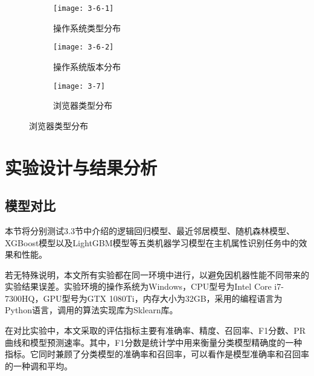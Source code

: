 \begin{figure}[!htbp]
    \centering
    \begin{subfigure}[b]{0.32\textwidth}
      \texttt{[image: 3-6-1]}
      \caption{操作系统类型分布}
    \end{subfigure}%
    \hspace{10pt}
    \begin{subfigure}[b]{0.32\textwidth}
      \texttt{[image: 3-6-2]}
      \caption{操作系统版本分布}
    \end{subfigure}
    \hspace{10pt}
    \begin{subfigure}[b]{0.29\textwidth}
      \texttt{[image: 3-7]}
      \caption{浏览器类型分布}
    \end{subfigure}  
    \centering  
\end{figure}

\section{实验设计与结果分析}

\subsection{模型对比}

本节将分别测试3.3节中介绍的逻辑回归模型、最近邻居模型、随机森林模型、XGBoost模型以及LightGBM模型等五类机器学习模型在主机属性识别任务中的效果和性能。

若无特殊说明，本文所有实验都在同一环境中进行，以避免因机器性能不同带来的实验结果误差。实验环境的操作系统为Windows，CPU型号为Intel Core i7-7300HQ，GPU型号为GTX 1080Ti，内存大小为32GB，采用的编程语言为Python语言，调用的算法实现库为Sklearn库。

在对比实验中，本文采取的评估指标主要有准确率、精度、召回率、F1分数、PR曲线和模型预测速率。其中，F1分数是统计学中用来衡量分类模型精确度的一种指标。它同时兼顾了分类模型的准确率和召回率，可以看作是模型准确率和召回率的一种调和平均。

